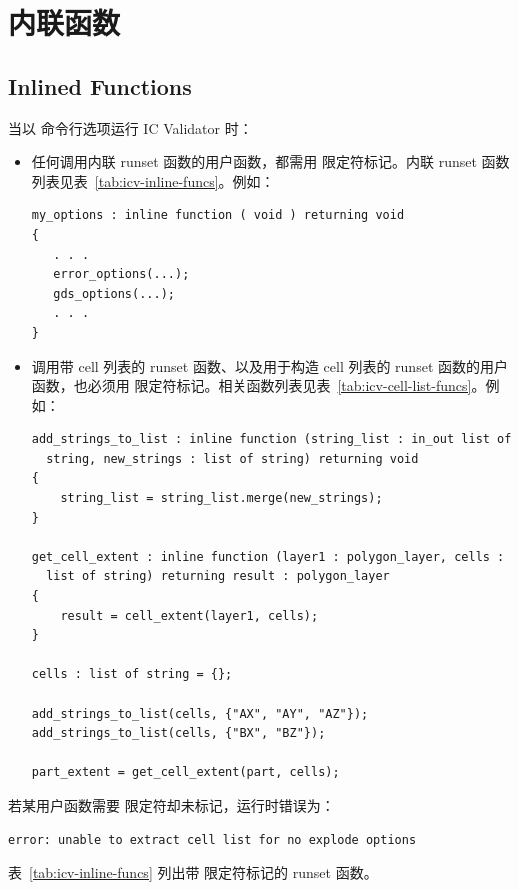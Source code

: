 \section{内联函数}
\subsection*{Inlined Functions}

当以  命令行选项运行 IC Validator 时：
\begin{itemize}
  \item 任何调用内联 runset 函数的用户函数，都需用  限定符标记。内联 runset 函数列表见表~\ref{tab:icv-inline-funcs}。例如：
\begin{lstlisting}[style=pxl]
my_options : inline function ( void ) returning void
{
   . . .
   error_options(...);
   gds_options(...);
   . . .
}
\end{lstlisting}

  \item 调用带 cell 列表的 runset 函数、以及用于构造 cell 列表的 runset 函数的用户函数，也必须用  限定符标记。相关函数列表见表~\ref{tab:icv-cell-list-funcs}。例如：
\begin{lstlisting}[style=pxl]
add_strings_to_list : inline function (string_list : in_out list of
  string, new_strings : list of string) returning void
{
    string_list = string_list.merge(new_strings);
}

get_cell_extent : inline function (layer1 : polygon_layer, cells :
  list of string) returning result : polygon_layer
{
    result = cell_extent(layer1, cells);
}

cells : list of string = {};

add_strings_to_list(cells, {"AX", "AY", "AZ"});
add_strings_to_list(cells, {"BX", "BZ"});

part_extent = get_cell_extent(part, cells);
\end{lstlisting}
\end{itemize}

若某用户函数需要  限定符却未标记，运行时错误为：
\begin{lstlisting}
error: unable to extract cell list for no explode options
\end{lstlisting}

表~\ref{tab:icv-inline-funcs} 列出带  限定符标记的 runset 函数。

